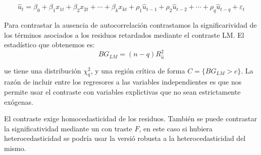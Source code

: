 \[\hat{u}_t=\beta_0+\beta_1x_{1t}+\beta_2x_{2t}+\cdots+\beta_kx_{kt}+\rho_1\hat{u}_{t-1}+\rho_2\hat{u}_{t-2}+\cdots+\rho_q\hat{u}_{t-q}+\varepsilon_t\]

Para contrastar la ausencia de autocorrelaci\'on contrastamos la significarividad de los t\'erminos asociados a los residuos retardados mediante el contraste LM. El estad\'istico que obtenemos es:
\[BG_{LM}=(n-q)R^2_{\hat{u}}\]

ue tiene una distribuci\'on $\chi^2_{q}$, y una regi\'on cr\'itica de forma $C=\{BG_{LM}>c\}$. La raz\'on de incluir entre los regresores a las variables independientes es que nos permite usar el contraste con variables explictivas que no sean estrictamente ex\'ogenas.

El contraste exige homocedasticidad de los residuos. Tambi\'en se puede contrastar la significatividad mediante un con traste $F$, en este caso si hubiera heterocedasticidad se podr\'ia usar la versi\'o robusta a la heterocedasticidad del mismo.